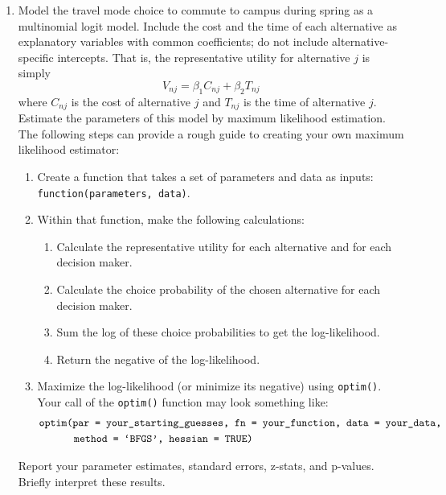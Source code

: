 \documentclass[11pt,letterpaper]{article}\usepackage[]{graphicx}\usepackage[]{color}
\begin{document}
\begin{enumerate}[label=\alph*., leftmargin=*]
	\item Model the travel mode choice to commute to campus during spring as a multinomial logit model. Include the cost and the time of each alternative as explanatory variables with common coefficients; do not include alternative-specific intercepts. That is, the representative utility for alternative $j$ is simply
	$$V_{nj} = \beta_1 C_{nj} + \beta_2 T_{nj}$$
	where $C_{nj}$ is the cost of alternative $j$ and $T_{nj}$ is the time of alternative $j$. Estimate the parameters of this model by maximum likelihood estimation. The following steps can provide a rough guide to creating your own maximum likelihood estimator:
	\begin{enumerate}[label=\Roman*.]
		\item Create a function that takes a set of parameters and data as inputs: \texttt{function(parameters, data)}.
		\item Within that function, make the following calculations:
		\begin{enumerate}[label=\roman*.]
			\item Calculate the representative utility for each alternative and for each decision maker.
			\item Calculate the choice probability of the chosen alternative for each decision maker.
			\item Sum the log of these choice probabilities to get the log-likelihood.
			\item Return the negative of the log-likelihood.
		\end{enumerate}
		\item Maximize the log-likelihood (or minimize its negative) using \texttt{optim()}. Your call of the \texttt{optim()} function may look something like:
		\begin{align*}
			&\text{\texttt{optim(par = your\_starting\_guesses, fn = your\_function, data = your\_data,}} \\
			& \qquad \quad \; \text{\texttt{method = `BFGS', hessian = TRUE)}}
		\end{align*}
	\end{enumerate}
	Report your parameter estimates, standard errors, z-stats, and p-values. Briefly interpret these results.


\end{enumerate}
\end{document}
